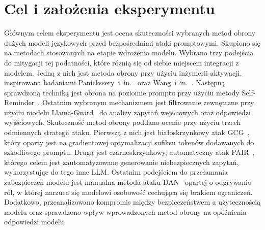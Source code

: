 \section{Cel i założenia eksperymentu}
Głównym celem eksperymentu jest ocena skuteczności wybranych metod obrony dużych modeli językowych przed bezpośrednimi ataki promptowymi. Skupiono się na metodach stosowanych na etapie wdrożenia modelu.
Wybrano trzy podejścia do mitygacji tej podatności, które różnią się od siebie miejscem integracji z modelem.
Jedną z nich jest metoda obrony przy użyciu inżynierii aktywacji, inspirowana badaniami Panickssery~i~in.~\cite{panickssery2024steeringllama2contrastive} oraz Wang~i~in.~\cite{wang2024inferalignerinferencetimealignmentharmlessness}.
Następną sprawdzoną techniką jest obrona na poziomie promptu przy użyciu metody Self-Reminder~\cite{wu2023selfreminder}.
Ostatnim wybranym mechanizmem jest filtrowanie zewnętrzne przy użyciu modelu Llama-Guard~\cite{inan2023llamaguardllmbasedinputoutput} do analizy zapytań wejściowych oraz odpowiedzi wyjściowych.
Skuteczność metod obrony poddano ocenie przy użyciu trzech odmiennych strategii ataku.
Pierwszą z nich jest białoskrzynkowy atak GCG~\cite{zou2023universaltransferableadversarialattacks}, który oparty jest na gradientowej optymalizacji sufiksu tokenów dodawanych do szkodliwego promptu.
Drugą jest czarnoskrzynkowy, automatyczny atak PAIR~\cite{chao2024jailbreakingblackboxlarge}, którego celem jest zautomatyzowane generowanie niebezpiecznych zapytań, wykorzystując do tego inne LLM.
Ostatnim podejściem do przełamania zabezpieczeń modelu jest manualna metoda ataku DAN~\cite{choi2025dan} opartej o odgrywanie ról, w której narzuca się modelowi osobowość cechującą się brakiem ograniczeń.
Dodatkowo, przeanalizowano kompromis między bezpieczeństwem a użytecznością modelu oraz sprawdzono wpływ wprowadzonych metod obrony na opóźnienia odpowiedzi modelu.